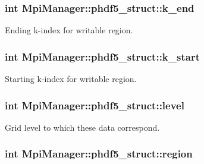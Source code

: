 \subsubsection[{\texorpdfstring{k\+\_\+end}{k_end}}]{\setlength{\rightskip}{0pt plus 5cm}int Mpi\+Manager\+::phdf5\+\_\+struct\+::k\+\_\+end}\hypertarget{struct_mpi_manager_1_1phdf5__struct_a2490c17798ca6cf4db002fa521f170c0}{}\label{struct_mpi_manager_1_1phdf5__struct_a2490c17798ca6cf4db002fa521f170c0}


Ending k-\/index for writable region. 

\subsubsection[{\texorpdfstring{k\+\_\+start}{k_start}}]{\setlength{\rightskip}{0pt plus 5cm}int Mpi\+Manager\+::phdf5\+\_\+struct\+::k\+\_\+start}\hypertarget{struct_mpi_manager_1_1phdf5__struct_a94d1c88859049aa2b37c9b659e071760}{}\label{struct_mpi_manager_1_1phdf5__struct_a94d1c88859049aa2b37c9b659e071760}


Starting k-\/index for writable region. 

\subsubsection[{\texorpdfstring{level}{level}}]{\setlength{\rightskip}{0pt plus 5cm}int Mpi\+Manager\+::phdf5\+\_\+struct\+::level}\hypertarget{struct_mpi_manager_1_1phdf5__struct_aa3f8cc807724b61ef3a37509f71100ab}{}\label{struct_mpi_manager_1_1phdf5__struct_aa3f8cc807724b61ef3a37509f71100ab}


Grid level to which these data correspond. 

\subsubsection[{\texorpdfstring{region}{region}}]{\setlength{\rightskip}{0pt plus 5cm}int Mpi\+Manager\+::phdf5\+\_\+struct\+::region}\hypertarget{struct_mpi_manager_1_1phdf5__struct_a1a9978693d5b50cb83b8ccc78fb23a6d}{}\label{struct_mpi_manager_1_1phdf5__struct_a1a9978693d5b50cb83b8ccc78fb23a6d}


